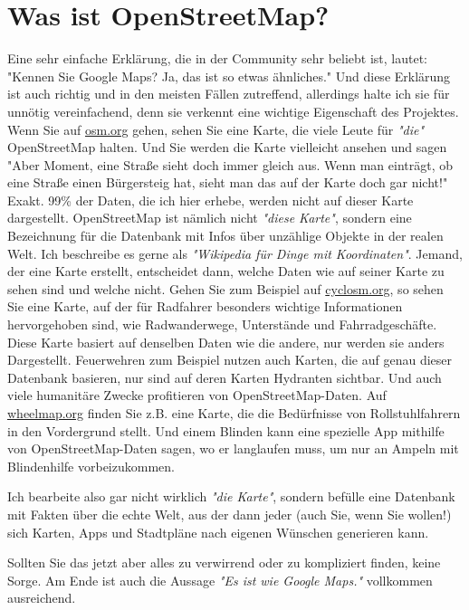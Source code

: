 \documentclass[10pt,foldmark,notumble]{leaflet}
\newcommand{\myhy}[1]{{\color{blue}\setulcolor{blue}\ul{#1}}}
\begin{document}
    \section{Was ist OpenStreetMap?}
    Eine sehr einfache Erklärung, die in der Community sehr beliebt ist, lautet: "Kennen Sie Google Maps? Ja, das ist so etwas ähnliches."
    Und diese Erklärung ist auch richtig und in den meisten Fällen zutreffend, allerdings halte ich sie für unnötig vereinfachend, denn sie verkennt eine wichtige Eigenschaft des Projektes.
    Wenn Sie auf \myhy{osm.org} gehen, sehen Sie eine Karte, die viele Leute für \textit{"die"} OpenStreetMap halten.
    Und Sie werden die Karte vielleicht ansehen und sagen "Aber Moment, eine Straße sieht doch immer gleich aus.
    Wenn man einträgt, ob eine Straße einen Bürgersteig hat, sieht man das auf der Karte doch gar nicht!"
    Exakt. 99\% der Daten, die ich hier erhebe, werden nicht auf dieser Karte dargestellt.
    OpenStreetMap ist nämlich nicht \textit{"diese Karte"}, sondern eine Bezeichnung für die Datenbank mit Infos über unzählige Objekte in der realen Welt.
    Ich beschreibe es gerne als \textit{"Wikipedia für Dinge mit Koordinaten"}.
    Jemand, der eine Karte erstellt, entscheidet dann, welche Daten wie auf seiner Karte zu sehen sind und welche nicht.
    Gehen Sie zum Beispiel auf \myhy{cyclosm.org}, so sehen Sie eine Karte, auf der für Radfahrer besonders wichtige Informationen hervorgehoben sind, wie Radwanderwege, Unterstände und Fahrradgeschäfte.
    Diese Karte basiert auf denselben Daten wie die andere, nur werden sie anders Dargestellt.
    Feuerwehren zum Beispiel nutzen auch Karten, die auf genau dieser Datenbank basieren, nur sind auf deren Karten Hydranten sichtbar.
    Und auch viele humanitäre Zwecke profitieren von OpenStreetMap-Daten.
    Auf \myhy{wheelmap.org} finden Sie z.B. eine Karte, die die Bedürfnisse von Rollstuhlfahrern in den Vordergrund stellt.
    Und einem Blinden kann eine spezielle App mithilfe von OpenStreetMap-Daten sagen, wo er langlaufen muss, um nur an Ampeln mit Blindenhilfe vorbeizukommen.

    Ich bearbeite also gar nicht wirklich \textit{"die Karte"}, sondern befülle eine Datenbank mit Fakten über die echte Welt, aus der dann jeder (auch Sie, wenn Sie wollen!) sich Karten, Apps und Stadtpläne nach eigenen Wünschen generieren kann.

    Sollten Sie das jetzt aber alles zu verwirrend oder zu kompliziert finden, keine Sorge.
    Am Ende ist auch die Aussage \textit{"Es ist wie Google Maps."} vollkommen ausreichend.
\end{document}
